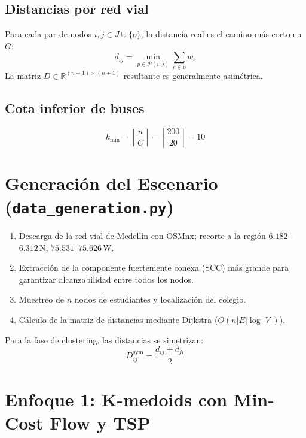 \documentclass[12pt,a4paper]{article}
\begin{document}
\subsection{Distancias por red vial}

Para cada par de nodos $i,j \in J\cup\{o\}$, la distancia real es el camino m\'as corto en $G$:
\begin{equation}
  d_{ij} = \min_{p\in\mathcal{P}(i,j)} \sum_{e\in p} w_e
\end{equation}
La matriz $D\in\mathbb{R}^{(n+1)\times(n+1)}$ resultante es generalmente asim\'etrica.

\subsection{Cota inferior de buses}

\begin{equation}
  k_{\min} = \left\lceil \frac{n}{C} \right\rceil = \left\lceil \frac{200}{20} \right\rceil = 10
\end{equation}

\section{Generaci\'on del Escenario (\texttt{data\_generation.py})}

\begin{enumerate}
  \item Descarga de la red vial de Medell\'in con OSMnx;
        recorte a la regi\'on $6.182$--$6.312$\textdegree\,N,
        $75.531$--$75.626$\textdegree\,W.
  \item Extracci\'on de la componente fuertemente conexa (SCC) m\'as grande
        para garantizar alcanzabilidad entre todos los nodos.
  \item Muestreo de $n$ nodos de estudiantes y localizaci\'on del colegio.
  \item C\'alculo de la matriz de distancias mediante Dijkstra
        ($O(n|E|\log|V|)$).
\end{enumerate}

Para la fase de clustering, las distancias se simetrizan:
\begin{equation}
  D^{\mathrm{sym}}_{ij} = \frac{d_{ij}+d_{ji}}{2}
\end{equation}

\section{Enfoque 1: K-medoids con Min-Cost Flow y TSP}
\end{document}
